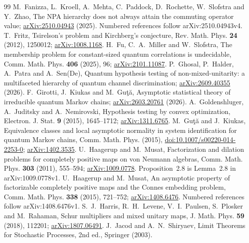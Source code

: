 \documentclass[11pt]{article}
\theoremstyle{definition}
\theoremstyle{remark}
\begin{document}
\begin{thebibliography}{99}
 M.~Fanizza, L.~Kroell, A.~Mehta, C.~Paddock, D.~Rochette, W.~Slofstra and Y.~Zhao, The NPA hierarchy does not always attain the commuting operator value; \href{https://arxiv.org/abs/2510.04943}{arXiv:2510.04943} (2025). Numbered references follow arXiv:2510.04943v4.
 T.~Fritz, Tsirelson's problem and Kirchberg's conjecture, Rev. Math. Phys. \textbf{24} (2012), 1250012; \href{https://arxiv.org/abs/1008.1168}{arXiv:1008.1168}.
 H.~Fu, C.~A.~Miller and W.~Slofstra, The membership problem for constant-sized quantum correlations is undecidable, Comm. Math. Phys. \textbf{406} (2025), 96; \href{https://arxiv.org/abs/2101.11087}{arXiv:2101.11087}.
 P.~Ghosal, P.~Halder, A.~Patra and A.~Sen(De), Quantum hypothesis testing of non-mixed-unitarity: a multifaceted hierarchy of quantum channel discrimination; \href{https://arxiv.org/abs/2609.40355}{arXiv:2609.40355} (2026).
 F.~Girotti, J.~Kiukas and M.~Gu\c{t}\u{a}, Asymptotic statistical theory of irreducible quantum Markov chains; \href{https://arxiv.org/abs/2603.20761}{arXiv:2603.20761} (2026).
 A.~Goldenshluger, A.~Juditsky and A.~Nemirovski, Hypothesis testing by convex optimization, Electron. J. Stat. \textbf{9} (2015), 1645--1712; \href{https://arxiv.org/abs/1311.6765}{arXiv:1311.6765}.
 M.~Gu\c{t}\u{a} and J.~Kiukas, Equivalence classes and local asymptotic normality in system identification for quantum Markov chains, Comm. Math. Phys. (2015), \href{https://doi.org/10.1007/s00220-014-2253-0}{doi:10.1007/s00220-014-2253-0}; \href{https://arxiv.org/abs/1402.3535}{arXiv:1402.3535}.
 U.~Haagerup and M.~Musat, Factorization and dilation problems for completely positive maps on von Neumann algebras, Comm. Math. Phys. \textbf{303} (2011), 555--594; \href{https://arxiv.org/abs/1009.0778}{arXiv:1009.0778}. Proposition~2.8 is Lemma~2.8 in arXiv:1009.0778v1.
 U.~Haagerup and M.~Musat, An asymptotic property of factorizable completely positive maps and the Connes embedding problem, Comm. Math. Phys. \textbf{338} (2015), 721--752; \href{https://arxiv.org/abs/1408.6476}{arXiv:1408.6476}. Numbered references follow arXiv:1408.6476v1.
 S.~J.~Harris, R.~H.~Levene, V.~I.~Paulsen, S.~Plosker and M.~Rahaman, Schur multipliers and mixed unitary maps, J. Math. Phys. \textbf{59} (2018), 112201; \href{https://arxiv.org/abs/1807.06491}{arXiv:1807.06491}.
 J.~Jacod and A.~N.~Shiryaev, Limit Theorems for Stochastic Processes, 2nd ed., Springer (2003).

\end{thebibliography}
\end{document}

